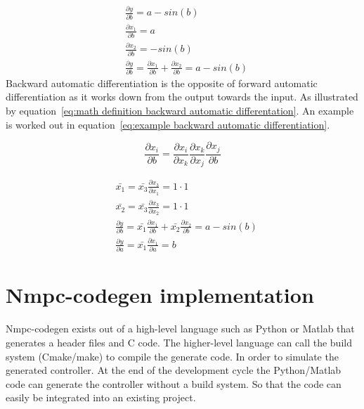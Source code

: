 \begin{equation}
	\begin{aligned}
		& \frac{\partial y}{\partial b} = a - sin(b) \\
		& \frac{\partial x_1}{\partial b} = a  \\
		& \frac{\partial x_2}{\partial b} = -sin(b) \\
		& \frac{\partial y}{\partial b} = \frac{\partial x_1}{\partial b} + \frac{\partial x_2}{\partial b}	 = a - sin(b)
	\end{aligned}
	\label{eq:example forward automatic differentiation}
\end{equation}
Backward automatic differentiation is the opposite of forward automatic differentiation as it works down from the output towards the input. As illustrated by equation~\ref{eq:math definition backward automatic differentation}. An example is worked out in equation~\ref{eq:example backward automatic differentiation}.


\begin{equation}
	\frac{\partial x_i}{\partial b} = \frac{\partial x_i}{\partial x_k}\frac{\partial x_k}{\partial x_j}\frac{\partial x_j}{\partial b}
	\label{eq:math definition backward automatic differentation}
\end{equation}

\begin{equation}
\begin{aligned}
& \bar{x_1} = \bar{x_3} \frac{\partial x_3}{\partial x_1} = 1 \cdot 1 \\
& \bar{x_2} = \bar{x_3} \frac{\partial x_3}{\partial x_2} = 1 \cdot 1 \\
& \frac{\partial y}{\partial b} = \bar{x_1} \frac{\partial x_1}{\partial b} + \bar{x_2} \frac{\partial x_2}{\partial b} = a - sin(b)\\
& \frac{\partial y}{\partial a} = \bar{x_1} \frac{\partial x_1}{\partial a} = b
\end{aligned}
\label{eq:example backward automatic differentiation}
\end{equation}


\section{Nmpc-codegen implementation}
Nmpc-codegen exists out of a high-level language such as Python or Matlab that generates a header files and C code. The higher-level language can call the build system (Cmake/make) to compile the generate code. In order to simulate the generated controller. At the end of the development cycle the Python/Matlab code can generate the controller without a build system. So that the code can easily be integrated into an existing project.
